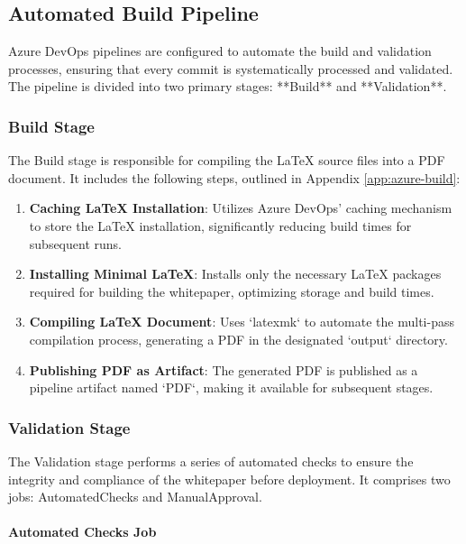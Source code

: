 \documentclass[11pt]{article}
\begin{document}
	\subsection{Automated Build Pipeline}

	Azure DevOps pipelines are configured to automate the build and validation processes, ensuring that every commit is systematically processed and validated. The pipeline is divided into two primary stages: **Build** and **Validation**.

	\subsubsection{Build Stage}

	The Build stage is responsible for compiling the LaTeX source files into a PDF document. It includes the following steps, outlined in Appendix \ref{app:azure-build}:

	\begin{enumerate}
		\item \textbf{Caching LaTeX Installation}: Utilizes Azure DevOps' caching mechanism to store the LaTeX installation, significantly reducing build times for subsequent runs.
		\item \textbf{Installing Minimal LaTeX}: Installs only the necessary LaTeX packages required for building the whitepaper, optimizing storage and build times.
		\item \textbf{Compiling LaTeX Document}: Uses `latexmk` to automate the multi-pass compilation process, generating a PDF in the designated `output` directory.
		\item \textbf{Publishing PDF as Artifact}: The generated PDF is published as a pipeline artifact named `PDF`, making it available for subsequent stages.
	\end{enumerate}

	\subsubsection{Validation Stage}

	The Validation stage performs a series of automated checks to ensure the integrity and compliance of the whitepaper before deployment. It comprises two jobs: AutomatedChecks and ManualApproval.

	\paragraph{Automated Checks Job}
\end{document}
